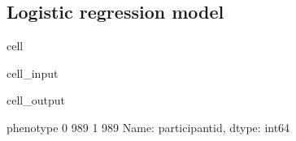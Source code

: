 \documentclass[letterpaper,10pt,english]{jupyterBook}
\begin{document}
\subsection{Logistic regression model}
\label{\detokenize{Cooper:id1}}
\begin{sphinxuseclass}{cell}\begin{sphinxVerbatimInput}

\begin{sphinxuseclass}{cell_input}
\begin{sphinxVerbatim}[commandchars=\\\{\}]
  \PYG{p}{[}  \PYG{p}{]}
  \PYG{p}{[}\PYG{p}{[}\PYG{p}{]}\PYG{p}{]}
  \PYG{p}{[}\PYG{p}{]}
     
\PYG{p}{[}\PYG{p}{]}
\end{sphinxVerbatim}

\end{sphinxuseclass}\end{sphinxVerbatimInput}
\begin{sphinxVerbatimOutput}

\begin{sphinxuseclass}{cell_output}
\begin{sphinxVerbatim}[commandchars=\\\{\}]
phenotype
0    989
1    989
Name: participant\PYGZus{}id, dtype: int64
\end{sphinxVerbatim}

\end{sphinxuseclass}\end{sphinxVerbatimOutput}

\end{sphinxuseclass}
\end{document}
